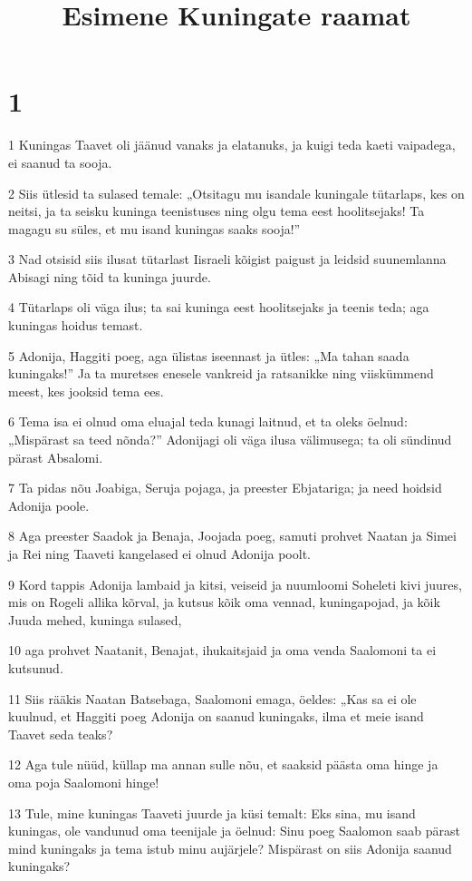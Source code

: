 

\title{Esimene Kuningate raamat}

\chapter{1}

\par 1 Kuningas Taavet oli jäänud vanaks ja elatanuks, ja kuigi teda kaeti vaipadega, ei saanud ta sooja.
\par 2 Siis ütlesid ta sulased temale: „Otsitagu mu isandale kuningale tütarlaps, kes on neitsi, ja ta seisku kuninga teenistuses ning olgu tema eest hoolitsejaks! Ta magagu su süles, et mu isand kuningas saaks sooja!”
\par 3 Nad otsisid siis ilusat tütarlast Iisraeli kõigist paigust ja leidsid suunemlanna Abisagi ning tõid ta kuninga juurde.
\par 4 Tütarlaps oli väga ilus; ta sai kuninga eest hoolitsejaks ja teenis teda; aga kuningas hoidus temast.
\par 5 Adonija, Haggiti poeg, aga ülistas iseennast ja ütles: „Ma tahan saada kuningaks!” Ja ta muretses enesele vankreid ja ratsanikke ning viiskümmend meest, kes jooksid tema ees.
\par 6 Tema isa ei olnud oma eluajal teda kunagi laitnud, et ta oleks öelnud: „Mispärast sa teed nõnda?” Adonijagi oli väga ilusa välimusega; ta oli sündinud pärast Absalomi.
\par 7 Ta pidas nõu Joabiga, Seruja pojaga, ja preester Ebjatariga; ja need hoidsid Adonija poole.
\par 8 Aga preester Saadok ja Benaja, Joojada poeg, samuti prohvet Naatan ja Simei ja Rei ning Taaveti kangelased ei olnud Adonija poolt.
\par 9 Kord tappis Adonija lambaid ja kitsi, veiseid ja nuumloomi Soheleti kivi juures, mis on Rogeli allika kõrval, ja kutsus kõik oma vennad, kuningapojad, ja kõik Juuda mehed, kuninga sulased,
\par 10 aga prohvet Naatanit, Benajat, ihukaitsjaid ja oma venda Saalomoni ta ei kutsunud.
\par 11 Siis rääkis Naatan Batsebaga, Saalomoni emaga, öeldes: „Kas sa ei ole kuulnud, et Haggiti poeg Adonija on saanud kuningaks, ilma et meie isand Taavet seda teaks?
\par 12 Aga tule nüüd, küllap ma annan sulle nõu, et saaksid päästa oma hinge ja oma poja Saalomoni hinge!
\par 13 Tule, mine kuningas Taaveti juurde ja küsi temalt: Eks sina, mu isand kuningas, ole vandunud oma teenijale ja öelnud: Sinu poeg Saalomon saab pärast mind kuningaks ja tema istub minu aujärjele? Mispärast on siis Adonija saanud kuningaks?
